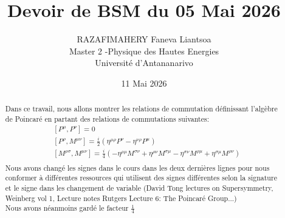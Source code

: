 \documentclass[12pt, a4paper]{article}
\title{Devoir de BSM du 05 Mai 2026}
\author{
	RAZAFIMAHERY Faneva Liantsoa\\
	\medskip %
	\normalsize Master 2 -Physique des Hautes Energies \\
	\medskip
	\normalsize Université d'Antananarivo  \\
}
\date{11 Mai 2026}
\begin{document}
	
 \maketitle
 \begin{abstract}
 	Dans ce travail, nous allons montrer les relations de commutation définissant l'algèbre de Poincaré en partant des relations de commutations suivantes:
 	\begin{equation}
 		\begin{split}
 		&[P^{\mu},P^{\nu}]=0\\
 		&[P^{\rho},M^{\mu \nu}]=\frac{i}{2} (\eta^{\mu\rho}P^{\nu}-\eta^{\nu\rho}P^{\mu})\\
 		&[M^{\rho \sigma},M^{\mu \nu}]=\frac{i}{4} (
 		-\eta^{\rho \mu}M^{\sigma \nu} + \eta^{\rho \nu}M^{\sigma \mu} -\eta^{\sigma \nu}M^{\rho \mu} + \eta^{\sigma \mu}M^{\rho \nu})\\
 		\end{split}
 	\end{equation}
 	Nous avons changé les signes dans le cours dans les deux dernières lignes pour nous conformer à différentes ressources qui utilisent des signes différentes selon la signature et le signe dans les changement de variable (David Tong lectures on Supersymmetry, Weinberg vol 1, Lecture notes Rutgers Lecture 6: The Poincaré Group...)\\
 	Nous avons néanmoins gardé le facteur \(\frac{1}{4}\) 
 \end{abstract} 
\end{document}
